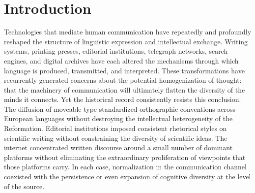 \documentclass[12pt,a4paper]{article}
\theoremstyle{definition}
\theoremstyle{plain}
\theoremstyle{remark}
\begin{document}
\begin{abstract}
We further argue that the more significant ecological risk of LLM-mediated communication lies
not in stylistic convergence but in the potential contraction of \emph{exploratory variance}
in knowledge discovery: the diversity of trajectories through which individuals encounter
novel ideas, conflicting interpretations, and unexpected conceptual recombinations. If
model-mediated search increasingly directs users toward the same conceptual summaries and
canonical explanations, the space of intellectual trajectories may contract even while
expressive diversity at the surface level remains intact. Understanding the cultural
consequences of generative AI therefore requires attention not only to the entropy of
linguistic form but also to the information ecology of exploration, discovery, and conceptual
variation.
\end{abstract}

\newpage
\tableofcontents
\newpage

\section{Introduction}
\label{sec:introduction}

Technologies that mediate human communication have repeatedly and profoundly reshaped the
structure of linguistic expression and intellectual exchange. Writing systems, printing
presses, editorial institutions, telegraph networks, search engines, and digital archives have
each altered the mechanisms through which language is produced, transmitted, and interpreted.
These transformations have recurrently generated concerns about the potential homogenization
of thought: that the machinery of communication will ultimately flatten the diversity of the
minds it connects. Yet the historical record consistently resists this conclusion. The
diffusion of moveable type standardized orthographic conventions across European languages
without destroying the intellectual heterogeneity of the Reformation. Editorial institutions
imposed consistent rhetorical styles on scientific writing without constraining the diversity
of scientific ideas. The internet concentrated written discourse around a small number of
dominant platforms without eliminating the extraordinary proliferation of viewpoints that
those platforms carry. In each case, normalization in the communication channel coexisted with
the persistence or even expansion of cognitive diversity at the level of the source.
\end{document}
